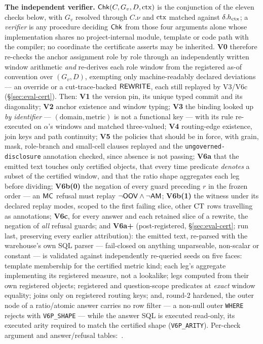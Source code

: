 \smallskip\noindent{}\textbf{The independent verifier.}\label{sec:cert:verifier}
$\mathsf{Chk}(C,G_v,D,\mathrm{ctx})$ is the conjunction of the eleven checks below, with
$G_v$ resolved through $C.\nu$ and $\mathrm{ctx}$ matched against $\delta.h_{\mathrm{ctx}}$; a
\emph{verifier} is any procedure deciding $\mathsf{Chk}$ from those four arguments
alone whose implementation shares no project-internal module, template or code
path with the compiler; no coordinate the certificate asserts may be
inherited. \textbf{V0} therefore re-checks the anchor assignment role by role through
an independently written window arithmetic \emph{and} re-derives each role
window from the registered as-of convention over $(G_v,D)$, exempting only
machine-readably declared deviations --- an override or a
cut-trace-backed $\mathsf{REWRITE}$, each
still replayed by V3/V6c (\S\ref{sec:eval-cert}). Then: \textbf{V1} the version pin, its unique
typed commit and its diagonality; \textbf{V2} anchor existence and window
typing; \textbf{V3} the binding looked up \emph{by identifier} ---
$(\text{domain},\text{metric})$ is not a functional key --- with its rule
re-executed on $\alpha$'s windows and matched three-valued; \textbf{V4}
routing-edge existence, join keys and path continuity; \textbf{V5} the policies
that should be in force, with grain, mask, role-branch and small-cell clauses
replayed and the \texttt{ungoverned-disclosure} annotation checked, since
absence is not passing; \textbf{V6a} that the emitted text touches only
certified objects,
that every time predicate \emph{denotes} a subset of the certified window, and
that the ratio shape aggregates each leg before dividing; \textbf{V6b(0)} the
negation of every guard preceding $r$ in the frozen order --- an $\mathsf{MC}$ refusal
must replay $\neg\mathsf{OOV}\wedge\neg\mathsf{AM}$; \textbf{V6b(1)} the witness under its
declared replay modes, scoped to the first failing slice, other $\mathrm{CT}$ rows
travelling as annotations; \textbf{V6c}, for every answer and each retained
slice of a rewrite, the negation of \emph{all} refusal guards; and
\textbf{V6a+} (post-registered, \S\ref{sec:eval-cert}; run last, preserving
every earlier attribution): the emitted text, re-parsed with the warehouse's
own SQL parser --- fail-closed on anything unparseable, non-scalar or
constant --- is validated against independently re-queried seeds on five
faces: template membership for the certified metric kind; each leg's
aggregate implementing its registered measure, not a lookalike; legs
computed from their own registered objects; registered and question-scope
predicates at \emph{exact} window equality; joins only on registered
routing keys; and, round-2 hardened, the outer node of a ratio/atomic answer
carries no row filter --- a non-null outer \texttt{WHERE} rejects with
\texttt{V6P\_SHAPE} --- while the answer SQL is executed read-only, its
executed arity required to match the certified shape (\texttt{V6P\_ARITY}).
Per-check
argument and answer/refusal tables:~\cite{asofgov-tr}.

